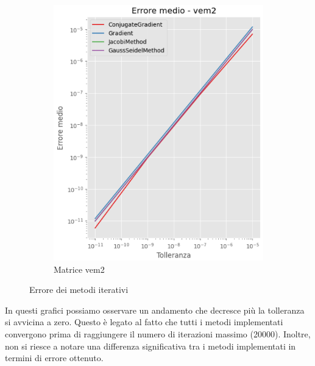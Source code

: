 \begin{figure}[!ht]
\begin{subfigure}{0.45\textwidth}
        \includegraphics[width=\textwidth]{./../report/Progetto_1_bis/img/error_vem2.png}
        \caption{Matrice vem2}
        \label{fig:error_vem2}
    \end{subfigure}
    \caption{Errore dei metodi iterativi}
    \label{fig:error}
\end{figure}

In questi grafici possiamo osservare un andamento che decresce più la tolleranza
si avvicina a zero. Questo è legato al fatto che tutti i metodi implementati
convergono prima di raggiungere il numero di iterazioni massimo (20000). Inoltre,
non si riesce a notare una differenza significativa tra i metodi implementati in termini 
di errore ottenuto.

